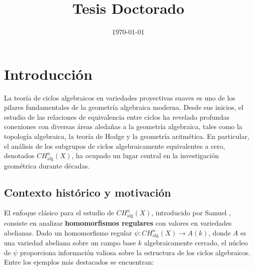 \documentclass[10pt]{amsart}
\theoremstyle{definition}
\theoremstyle{remark}
\theoremstyle{definition}
\begin{document}
\title{Tesis Doctorado}







\address{Instituto de Matem\'aticas, Universidad Nacional Aut\'onoma de M\'exico\\ Semestre 2024-1}
\date{\today}
\maketitle

\tableofcontents
\newpage










\section{Introducción}
La teoría de ciclos algebraicos en variedades proyectivas suaves es uno de los pilares fundamentales de la geometría algebraica moderna. Desde sus inicios, el estudio de las relaciones de equivalencia entre ciclos ha revelado profundas conexiones con diversas áreas aledañas a la geometría algebraica, tales como la topología algebraica, la teoría de Hodge y la geometría aritmética. En particular, el análisis de los subgrupos de ciclos algebraicamente equivalentes a cero, denotados $CH^{n}_{\mathrm{alg}}(X)$, ha ocupado un lugar central en la investigación geométrica durante décadas.

\subsection{Contexto histórico y motivación}

El enfoque clásico para el estudio de $CH^{n}_{\mathrm{alg}}(X)$, introducido por Samuel \cite{Sam60}, consiste en analizar \textbf{homomorfismos regulares} con valores en variedades abelianas. Dado un homomorfismo regular $\psi:CH^{n}_{\mathrm{alg}}(X) \to A(k)$, donde $A$ es una variedad abeliana sobre un campo base $k$ algebraicamente cerrado, el núcleo de $\psi$ proporciona información valiosa sobre la estructura de los ciclos algebraicos. Entre los ejemplos más destacados se encuentran:
\end{document}
